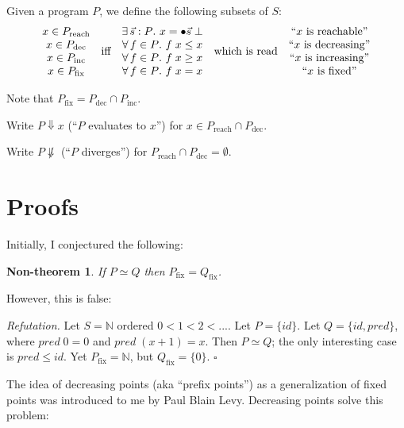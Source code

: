 \documentclass{article}
\newcommand{\fa}[1]{\forall\,{#1}.\ }
\newcommand{\te}[1]{\exists\,{#1}.\ }
\newcommand{\N}{\mathbb{N}}
\newcommand{\todo}[1]{{\color{red}{#1}}}
\newtheorem{nontheorem}{Non-theorem}
\newenvironment{refutation}
  {\vspace{0.5em}\noindent\textit{Refutation.}}
  {\hfill$\square$\vspace{0.5em}}
\begin{document}
\newcommand{\dec}[1]{\ensuremath{{#1}_{\text{dec}}}}
\newcommand{\inc}[1]{\ensuremath{{#1}_{\text{inc}}}}
\newcommand{\fixed}[1]{\ensuremath{{#1}_{\text{fix}}}}
\newcommand{\reach}[1]{\ensuremath{{#1}_{\text{reach}}}}
\newcommand*{\defeq}{\stackrel{\text{def}}{=}}

Given a program $P$, we define the following subsets of $S$:
\[
\begin{array}{ccccc}
  x \in \reach{P}
  &\multirow{4}{*}{\text{iff}}& \te{\vec{s} : P} x = \seq{s}\;\bot
  &\multirow{4}{*}{which is read}&\text{``$x$ is reachable''}\\
  x \in \dec{P} && \fa{f \in P}{f\;x \le x} && \text{``$x$ is decreasing''}\\
  x \in \inc{P} && \fa{f \in P}{f\;x \ge x} && \text{``$x$ is increasing''}\\
  x \in \fixed{P} && \fa{f \in P}{f\;x = x} && \text{``$x$ is fixed''}
\end{array}
\]

\todo{Do we need to consider increasing points?}

Note that $\fixed{P} = \dec{P} \cap \inc{P}$.

\newcommand{\eval}{\Downarrow}
\newcommand{\diverge}{\not\eval}

Write $P \eval x$ (``$P$ evaluates to $x$'') for $x \in \reach{P} \cap \dec{P}$.

Write $P \diverge$ (``$P$ diverges'') for $\reach{P} \cap \dec{P} = \emptyset$.


\section{Proofs}

Initially, I conjectured the following:

\begin{nontheorem}
  If $P \simeq Q$ then $\fixed{P} = \fixed{Q}$.
\end{nontheorem}

However, this is false:

\begin{refutation}
  Let $S = \N$ ordered $0 < 1 < 2 < ...$. Let $P = \{id\}$. Let $Q = \{id,
  pred\}$, where $pred\; 0 = 0$ and $pred\; (x+1) = x$. Then $P \simeq Q$; the
  only interesting case is $pred \le id$. Yet $\fixed{P} = \N$, but $\fixed{Q} =
  \{0\}$.
\end{refutation}

The idea of decreasing points (aka ``prefix points'') as a generalization of
fixed points was introduced to me by Paul Blain Levy. Decreasing points solve
this problem:
\end{document}
